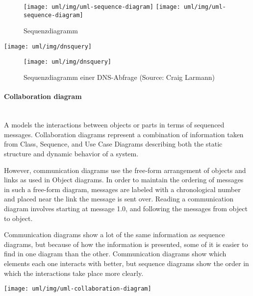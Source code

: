 \begin{minipage}[c]{0.45\linewidth}
%
%
\begin{figure}[H]
\begin{center}
\ifslides
\texttt{[image: uml/img/uml-sequence-diagram]}
\else
\texttt{[image: uml/img/uml-sequence-diagram]}
\fi
\caption{Sequenzdiagramm}
\label{SEQ}
\end{center}
\end{figure}
\ifslides
\begin{center}
\texttt{[image: uml/img/dnsquery]}
\end{center}
\else
\begin{figure}[H]
\begin{center}
\texttt{[image: uml/img/dnsquery]}
\caption{Sequenzdiagramm einer DNS-Abfrage (Source: Craig Larmann)}
\end{center}
\end{figure}
\fi
%
\paragraph{Collaboration diagram}\mbox{} \\
A  models the interactions between objects
or parts in terms of sequenced messages. Collaboration diagrams represent
a combination of information taken from Class, Sequence, and Use Case
Diagrams describing both the static structure and dynamic behavior of a system.

However, communication diagrams use the free-form arrangement of objects
and links as used in Object diagrams. In order to maintain the ordering of
messages in such a free-form diagram, messages are labeled with a
chronological number and placed near the link the message is sent over.
Reading a communication diagram involves starting at message 1.0, and
following the messages from object to object.

Communication diagrams show a lot of the same information as sequence
diagrams, but because of how the information is presented, some of it
is easier to find in one diagram than the other. Communication diagrams
show which elements each one interacts with better, but sequence
diagrams show the order in which the interactions take place more clearly.

\ifslides
\texttt{[image: uml/img/uml-collaboration-diagram]}
\else

\end{minipage}
